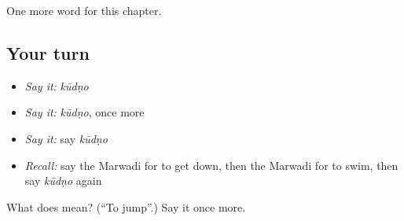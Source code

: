 \begin{grammarlens}[title={What you've built}]
One more word for this chapter.
\end{grammarlens}

\subsection*{Your turn}
\begin{itemize}
\raggedright
  \item \emph{Say it:} \emph{kūdṇo}
  \item \emph{Say it:} \emph{kūdṇo}, once more
  \item \emph{Say it:} say \emph{kūdṇo}
  \item \emph{Recall:} say the Marwadi for to get down, then the Marwadi for to swim, then say \emph{kūdṇo} again
\end{itemize}

\begin{tcolorbox}[breakable,colback=teal!4,colframe=teal!35!black,title={Before you move on}]
What does  mean? (\textquotedblleft{}To jump\textquotedblright{}.) Say it once more.
\end{tcolorbox}
